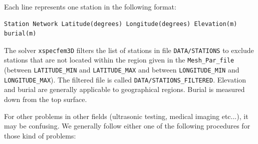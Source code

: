 \noindent
Each line represents one station in the following format:
{\small
\begin{verbatim}
Station Network Latitude(degrees) Longitude(degrees) Elevation(m) burial(m)
\end{verbatim}
}
The solver \texttt{xspecfem3D} filters the list of stations in file
\texttt{DATA/STATIONS} to exclude stations that are not located within
the region given in the \texttt{Mesh\_Par\_file} (between \texttt{LATITUDE\_MIN}
and \texttt{LATITUDE\_MAX} and between \texttt{LONGITUDE\_MIN} and
\texttt{LONGITUDE\_MAX}). The filtered file is called \texttt{DATA/STATIONS\_FILTERED}.
Elevation and burial are generally applicable to geographical regions.
Burial is measured down from the top surface.\newline


\noindent
For other problems in other
fields (ultrasonic testing, medical imaging etc...),
it may be confusing. We generally follow either one of the following
procedures for those kind of problems:
